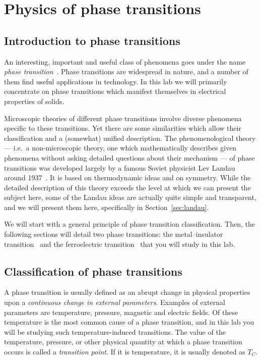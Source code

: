 \documentclass[11pt,a4paper]{article}
\begin{document}
\section{Physics of phase transitions}\label{app:physics}

\subsection{Introduction to phase transitions}

An interesting, important and useful class of phenomena goes under the name
\emph{phase transition}~\cite{ref:gittrman,ref:papon}. Phase transitions are
widespread in nature, and a number of them find useful applications in
technology. In this lab we will primarily concentrate on phase transitions which
manifest themselves in electrical properties of solids.

Microscopic theories of different phase transitions involve diverse phenomena
specific to these transitions. Yet there are some similarities which allow their
classification and a (somewhat) unified description. The phenomenological theory
--- i.e.\ a non-microscopic theory, one which mathematically describes given
phenomena without asking detailed questions about their mechanism --- of phase
transitions was developed largely by a famous Soviet physicist Lev Landau around
1937~\cite{ref:gittrman,ref:papon,ref:landau1,ref:landau2}. It is based on
thermodynamic ideas and on symmetry. While the detailed description of this
theory exceeds the level at which we can present the subject here, some of the
Landau ideas are actually quite simple and transparent, and we will present them
here, specifically in Section~\ref{sec:landau}.

We will start with a general principle of phase transition classification. Then,
the following sections will detail two phase transitions: the metal--insulator
transition~\cite{ref:dobro,ref:mottbook,ref:mott1949} and the ferroelectric
transition~\cite{ref:jona,ref:blakemore,ref:umich} that you will study in this
lab.

\subsection{Classification of phase transitions}

A phase transition is usually defined as an abrupt change in physical properties
upon a \emph{continuous change in external parameters}. Examples of external
parameters are temperature, pressure, magnetic and electric fields. Of these
temperature is the most common cause of a phase transition, and in this lab you
will be studying such temperature-induced transitions. The value of the
temperature, pressure, or other physical quantity at which a phase transition
occurs is called a \emph{transition point}. If it is temperature, it is usually
denoted as $T_C$.
\end{document}
